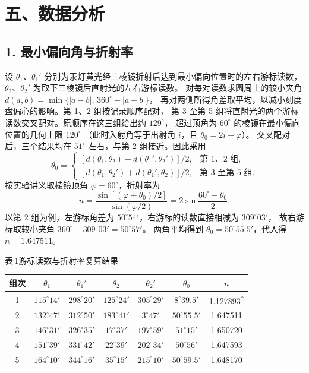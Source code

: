 \documentclass[UTF8,zihao=-4]{ctexart}
\begin{document}
\section*{五、数据分析}

\subsection*{1. 最小偏向角与折射率}

设 $\theta_1$、$\theta_1'$ 分别为汞灯黄光经三棱镜折射后达到最小偏向位置时的左右游标读数，
$\theta_2$、$\theta_2'$ 为取下三棱镜后直射光的左右游标读数。
对每对读数求圆周上的较小夹角 $d(a,b)=\min\{|a-b|,\,360^\circ-|a-b|\}$，
再对两侧所得角差取平均，以减小刻度盘偏心的影响。第 1、2 组按记录顺序配对，
第 3 至第 5 组将直射光的两个游标读数交叉配对。原顺序在这三组给出约 $129^\circ$，
超过顶角为 $60^\circ$ 的棱镜在最小偏向位置的几何上限 $120^\circ$
（此时入射角等于出射角 $i$，且 $\theta_0=2i-\varphi$）。
交叉配对后，三个结果均在 $51^\circ$ 左右，与第 2 组接近。因此采用
\[
  \theta_0=
  \begin{cases}
    [d(\theta_1,\theta_2)+d(\theta_1',\theta_2')]/2, & \text{第 1、2 组},\\
    [d(\theta_1,\theta_2')+d(\theta_1',\theta_2)]/2, & \text{第 3 至第 5 组}.
  \end{cases}
\]
按实验讲义取棱镜顶角 $\varphi=60^\circ$，折射率为
\[
  n=\frac{\sin[(\varphi+\theta_0)/2]}{\sin(\varphi/2)}
   =2\sin\frac{60^\circ+\theta_0}{2}.
\]
以第 2 组为例，左游标角差为 $50^\circ54'$，右游标的读数直接相减为 $309^\circ03'$，
故右游标取较小夹角 $360^\circ-309^\circ03'=50^\circ57'$。
两角平均得到 $\theta_0=50^\circ55.5'$，代入得 $n=1.647511$。

\begin{center}
  \small
  表\,1\quad 游标读数与折射率复算结果\par\smallskip
  \begin{tabular}{@{}ccccccc@{}}
    \toprule
    组次 & $\theta_1$ & $\theta_1'$ & $\theta_2$ & $\theta_2'$ & $\theta_0$ & $n$ \\
    \midrule
    1 & $115^\circ14'$ & $298^\circ20'$ & $125^\circ24'$ & $305^\circ29'$
      & $8^\circ39.5'$ & 1.127893\textsuperscript{*} \\
    2 & $132^\circ47'$ & $312^\circ50'$ & $183^\circ41'$ & $3^\circ47'$
      & $50^\circ55.5'$ & 1.647511 \\
    3 & $146^\circ31'$ & $326^\circ35'$ & $17^\circ37'$ & $197^\circ59'$
      & $51^\circ15'$ & 1.650720 \\
    4 & $151^\circ39'$ & $331^\circ42'$ & $22^\circ39'$ & $202^\circ34'$
      & $50^\circ56'$ & 1.647593 \\
    5 & $164^\circ10'$ & $344^\circ16'$ & $35^\circ15'$ & $215^\circ10'$
      & $50^\circ59.5'$ & 1.648170 \\
    \bottomrule
  \end{tabular}
\end{center}
\end{document}

